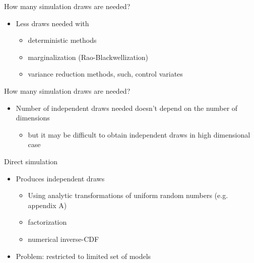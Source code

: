 \documentclass[finnish,english,t]{beamer}
\begin{document}
\begin{frame}{How many simulation draws are needed?}

  \begin{itemize}
  \item Less draws needed with
    \begin{itemize}
    \item deterministic methods
    \item marginalization (Rao-Blackwellization)
    \item variance reduction methods, such, control variates
    \end{itemize}
  \end{itemize}

\end{frame}

\begin{frame}{How many simulation draws are needed?}

  \begin{itemize}
  \item Number of independent draws needed doesn't depend on the number of dimensions
    \begin{itemize}
    \item but it may be difficult to obtain independent draws in high dimensional case
    \end{itemize}
  \end{itemize}

\end{frame}

\begin{frame}
{Direct simulation}

  \begin{itemize}
  \item Produces independent draws
    \begin{itemize}
    \item Using analytic transformations of uniform random numbers
      (e.g. appendix A)
    \item factorization
    \item numerical inverse-CDF
    \end{itemize}
  \item Problem: restricted to limited set of models
  \end{itemize}

\end{frame}
\end{document}
